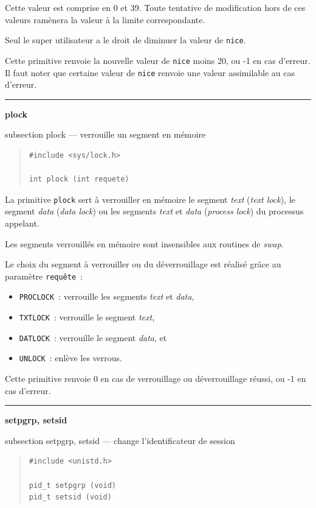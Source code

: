 \documentclass [twoside] {report}
\newcommand {\primitive} [1]
    {
	\phantomsection
	{\large \textbf {#1}}
	\addcontentsline {toc} {subsection} {#1}
    }
\newcommand {\separation}
    {
	\vspace {5mm}
	\nopagebreak
	\hrule
    }
\begin{document}
Cette valeur est comprise en 0 et 39. Toute
tentative de modification hors de ces valeurs
ramènera la valeur à la limite correspondante.

Seul le super utilisateur a le droit de diminuer
la valeur de \texttt {nice}.

Cette primitive renvoie la nouvelle valeur de
\texttt {nice} moins 20, ou -1 en cas d'erreur. Il faut
noter que certaine valeur de \texttt {nice} renvoie une
valeur assimilable au cas d'erreur.




\separation
\primitive {plock} --- verrouille un segment en mémoire

\begin {quote}
\begin {verbatim}
#include <sys/lock.h>

int plock (int requete)
\end{verbatim}
\end {quote}

La primitive \texttt {plock} sert à verrouiller en
mémoire le segment \textit {text} (\textit {text lock}), le
segment \textit {data} (\textit {data lock}) ou les segments
\textit {text} et \textit {data} (\textit {process lock}) du processus
appelant.

Les segments verrouillés en mémoire sont
insensibles aux routines de \textit {swap}.

Le choix du segment à verrouiller ou du
déverrouillage est réalisé grâce au paramètre
\texttt {requête}~:

\begin {itemize}
    \item \texttt {PROCLOCK}~: verrouille les segments \textit {text} et \textit {data},
    \item \texttt {TXTLOCK}~: verrouille le segment \textit {text},
    \item \texttt {DATLOCK}~: verrouille le segment \textit {data}, et
    \item \texttt {UNLOCK}~: enlève les verrous.
\end {itemize}

Cette primitive renvoie 0 en cas de verrouillage
ou déverrouillage réussi, ou -1 en cas d'erreur.




\separation
\primitive {setpgrp, setsid} --- change l'identificateur de session

\begin {quote}
\begin {verbatim}
#include <unistd.h>

pid_t setpgrp (void)
pid_t setsid (void)
\end{verbatim}
\end {quote}
\end{document}
